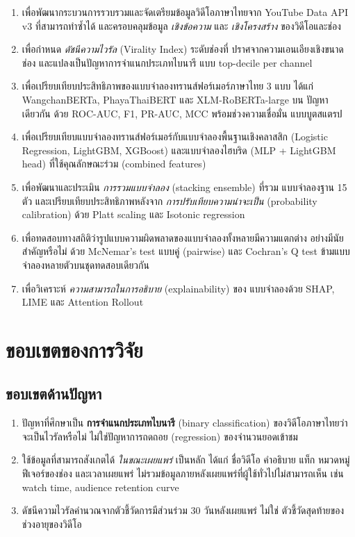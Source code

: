 \begin{enumerate}[leftmargin=2.5em,label=\arabic*.]
  \item เพื่อพัฒนากระบวนการรวบรวมและจัดเตรียมข้อมูลวิดีโอภาษาไทยจาก YouTube
        Data API v3 ที่สามารถทำซ้ำได้ และครอบคลุมข้อมูล \emph{เชิงข้อความ}
        และ \emph{เชิงโครงสร้าง} ของวิดีโอและช่อง
  \item เพื่อกำหนด \emph{ดัชนีความไวรัล} (Virality Index) ระดับช่องที่
        ปราศจากความเอนเอียงเชิงขนาดช่อง และแปลงเป็นปัญหาการจำแนกประเภทไบนารี
        แบบ top-decile per channel
  \item เพื่อเปรียบเทียบประสิทธิภาพของแบบจำลองทรานส์ฟอร์เมอร์ภาษาไทย 3 แบบ
        ได้แก่ WangchanBERTa, PhayaThaiBERT และ XLM-RoBERTa-large บน
        ปัญหาเดียวกัน ด้วย ROC-AUC, F1, PR-AUC, MCC พร้อมช่วงความเชื่อมั่น
        แบบบูตสแตรป
  \item เพื่อเปรียบเทียบแบบจำลองทรานส์ฟอร์เมอร์กับแบบจำลองพื้นฐานเชิงคลาสสิก
        (Logistic Regression, LightGBM, XGBoost) และแบบจำลองไฮบริด (MLP +
        LightGBM head) ที่ใช้คุณลักษณะร่วม (combined features)
  \item เพื่อพัฒนาและประเมิน \emph{การรวมแบบจำลอง} (stacking ensemble) ที่รวม
        แบบจำลองฐาน 15 ตัว และเปรียบเทียบประสิทธิภาพหลังจาก
        \emph{การปรับเทียบความน่าจะเป็น} (probability calibration) ด้วย
        Platt scaling และ Isotonic regression
  \item เพื่อทดสอบทางสถิติว่ารูปแบบความผิดพลาดของแบบจำลองทั้งหลายมีความแตกต่าง
        อย่างมีนัยสำคัญหรือไม่ ด้วย McNemar's test แบบคู่ (pairwise) และ
        Cochran's Q test ข้ามแบบจำลองหลายตัวบนชุดทดสอบเดียวกัน
  \item เพื่อวิเคราะห์ \emph{ความสามารถในการอธิบาย} (explainability) ของ
        แบบจำลองด้วย SHAP, LIME และ Attention Rollout
\end{enumerate}

\section{ขอบเขตของการวิจัย}
\label{sec:intro-scope}

\subsection{ขอบเขตด้านปัญหา}
\begin{enumerate}[leftmargin=2.5em,label=\arabic*.]
  \item ปัญหาที่ศึกษาเป็น \textbf{การจำแนกประเภทไบนารี} (binary classification)
        ของวิดีโอภาษาไทยว่าจะเป็นไวรัลหรือไม่ ไม่ใช่ปัญหาการถดถอย (regression)
        ของจำนวนยอดเข้าชม
  \item ใช้ข้อมูลที่สามารถสังเกตได้ \emph{ในขณะเผยแพร่} เป็นหลัก ได้แก่
        ชื่อวิดีโอ คำอธิบาย แท็ก หมวดหมู่ ฟีเจอร์ของช่อง และเวลาเผยแพร่
        ไม่รวมข้อมูลภายหลังเผยแพร่ที่ผู้ใช้ทั่วไปไม่สามารถเห็น เช่น watch
        time, audience retention curve
  \item ดัชนีความไวรัลคำนวณจากตัวชี้วัดการมีส่วนร่วม 30 วันหลังเผยแพร่ ไม่ใช่
        ตัวชี้วัดสุดท้ายของช่วงอายุของวิดีโอ
\end{enumerate}


